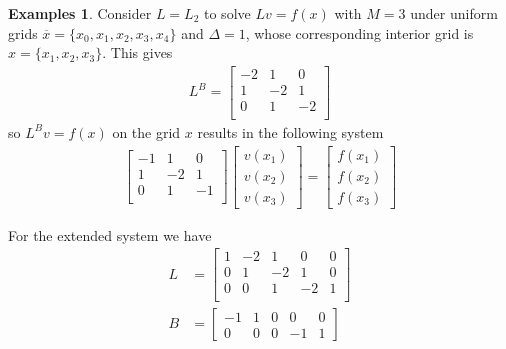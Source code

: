 \documentclass[11pt]{article}
\theoremstyle{definition}
\newtheorem{example}{Examples}[section]
\begin{document}
\begin{example}\label{ex:gaussian-elimination-reflecting-barrier}
	Consider $L = L_{2}$ to solve $L v = f(x)$ with $M = 3$ under uniform grids $\overline{x} = \{x_0, x_1, x_2, x_3, x_4\}$ and $\Delta = 1$, whose corresponding interior grid is $x = \{x_1, x_2, x_3\}$. This gives
	\begin{align}
	L^B = 	 \begin{bmatrix}
	-2 & 1 & 0 \\
	1 & -2 & 1 \\
	0 & 1 & -2 \\
	\end{bmatrix}
	\end{align}
	so $L^B v= f(x)$ on the grid $x$ results in the following system
	\begin{align} \label{eq:extended-system-reflecting-barrier-reduced-system}
	\begin{bmatrix}
	-1 & 1 & 0  \\
	1 & -2 & 1 \\
	0 & 1 & -1 \\
	\end{bmatrix} 	  \begin{bmatrix}
	v(x_1) \\
	v(x_2) \\
	v(x_3)
	\end{bmatrix}
	=
	\begin{bmatrix}
	f(x_1) \\
	f(x_2) \\
	f(x_3)
	\end{bmatrix}
	\end{align}


	For the extended system we have
	\begin{align}
	{L} &=
	\begin{bmatrix}
	1 & -2 & 1 & 0 & 0 \\
	0 & 1 & -2 & 1 & 0 \\
	0 & 0 & 1 & -2 & 1 \\
	\end{bmatrix} \\
	B &= \begin{bmatrix}
	-1 & 1  & 0 & 0 & 0 \\
	0 & 0 & 0 & -1 & 1
	\end{bmatrix}
	\end{align}


\end{example}
\end{document}
